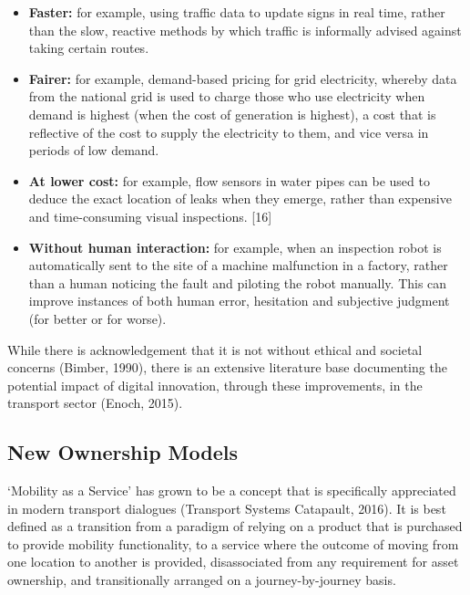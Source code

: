 \documentclass[journal]{IEEEtran}
\begin{document}
\begin{itemize}
\item {\textbf{Faster:}} for example, using traffic data to update
  signs in real time, rather than the slow, reactive methods by which
  traffic is informally advised against taking certain routes.
\item {\textbf{Fairer:}} for example, demand-based pricing for grid
  electricity, whereby data from the national grid is used to charge
  those who use electricity when demand is highest (when the cost of
  generation is highest), a cost that is reflective of the cost to
  supply the electricity to them, and vice versa in periods of low
  demand.
\item {\textbf{At lower cost:}} for example, flow sensors in water
  pipes can be used to deduce the exact location of leaks when they
  emerge, rather than expensive and time-consuming visual
  inspections. [16]
\item {\textbf{Without human interaction:}} for example, when an
  inspection robot is automatically sent to the site of a machine
  malfunction in a factory, rather than a human noticing the fault and
  piloting the robot manually. This can improve instances of both
  human error, hesitation and subjective judgment (for better or for
  worse).
\end{itemize}

While there is acknowledgement that it is not without ethical and
societal concerns (Bimber, 1990), there is an extensive literature
base documenting the potential impact of digital innovation, through
these improvements, in the transport sector (Enoch, 2015).


\subsection{New Ownership Models}

`Mobility as a Service' has grown to be a concept that is specifically
appreciated in modern transport dialogues (Transport Systems
Catapault, 2016). It is best defined as a transition from a paradigm
of relying on a product that is purchased to provide mobility
functionality, to a service where the outcome of moving from one
location to another is provided, disassociated from any requirement
for asset ownership, and transitionally arranged on a
journey-by-journey basis.
\end{document}
